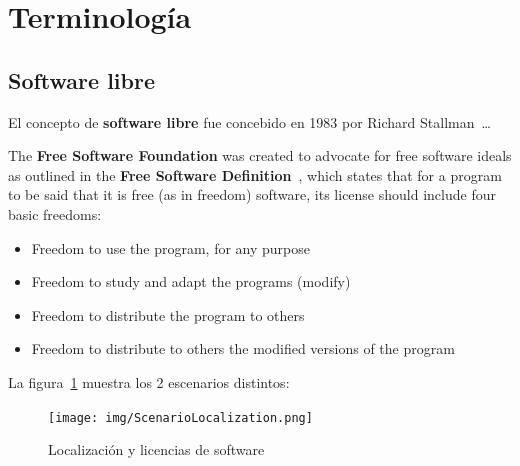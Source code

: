\documentclass[a4paper, 12pt]{book}
\begin{document}



\section{Terminología}
\label{sec:terminology}

\subsection{Software libre}
\label{subsec:freesoftware}
El concepto de \textbf{software libre} fue concebido en 1983 por Richard
Stallman~\cite{GNUproject}\dots

The \textbf{Free Software Foundation} was created to advocate for free software
ideals as outlined in the \textbf{Free Software
Definition}~\cite{FreeSoftwareDef}, which states that for a program to be said
that it is free (as in freedom) software, its license should include four basic
freedoms:
\begin{itemize}
 \item Freedom to use the program, for any purpose
 \item Freedom to study and adapt the programs (modify)
 \item Freedom to distribute the program to others
 \item Freedom to distribute to others the modified versions of the program
\end{itemize}


La figura~\ref{fig:ScenarioLocalization} muestra los 2 escenarios distintos:

  \begin{center}
   \begin{figure}[htbp]
   \begin{center}
     \texttt{[image: img/ScenarioLocalization.png]}
     \caption{Localización y licencias de software}
\label{fig:ScenarioLocalization}
   \end{center}
    \end{figure}
   \end{center}
\end{document}
